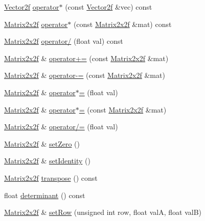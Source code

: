 \begin{DoxyCompactItemize}
\hyperlink{classh2_1_1_vector2f}{Vector2f} \hyperlink{classh2_1_1_matrix2x2f_a3ad4e56558f1a3640ebc45496bcd9bb0}{operator$\ast$} (const \hyperlink{classh2_1_1_vector2f}{Vector2f} \&vec) const 
\item 
\hyperlink{classh2_1_1_matrix2x2f}{Matrix2x2f} \hyperlink{classh2_1_1_matrix2x2f_abffdd48dd8586bc988bdf63a3cc94dad}{operator$\ast$} (const \hyperlink{classh2_1_1_matrix2x2f}{Matrix2x2f} \&mat) const 
\item 
\hyperlink{classh2_1_1_matrix2x2f}{Matrix2x2f} \hyperlink{classh2_1_1_matrix2x2f_ae05912db875fc5b7bfd77773f184a35d}{operator/} (float val) const 
\item 
\hyperlink{classh2_1_1_matrix2x2f}{Matrix2x2f} \& \hyperlink{classh2_1_1_matrix2x2f_ae3acc20003e50ded1a4848ab920c76e2}{operator+=} (const \hyperlink{classh2_1_1_matrix2x2f}{Matrix2x2f} \&mat)
\item 
\hyperlink{classh2_1_1_matrix2x2f}{Matrix2x2f} \& \hyperlink{classh2_1_1_matrix2x2f_a2d690ddea1dc40e8788c00aac187dba9}{operator-\/=} (const \hyperlink{classh2_1_1_matrix2x2f}{Matrix2x2f} \&mat)
\item 
\hyperlink{classh2_1_1_matrix2x2f}{Matrix2x2f} \& \hyperlink{classh2_1_1_matrix2x2f_a54fbc643d202dfde6b97dc0d6d4ebb6d}{operator$\ast$=} (float val)
\item 
\hyperlink{classh2_1_1_matrix2x2f}{Matrix2x2f} \& \hyperlink{classh2_1_1_matrix2x2f_aa56e404e4a178b2b59c54452822f9dd0}{operator$\ast$=} (const \hyperlink{classh2_1_1_matrix2x2f}{Matrix2x2f} \&mat)
\item 
\hyperlink{classh2_1_1_matrix2x2f}{Matrix2x2f} \& \hyperlink{classh2_1_1_matrix2x2f_a5412f6ddb68a2e78b83eef38eb179e66}{operator/=} (float val)
\item 
\hyperlink{classh2_1_1_matrix2x2f}{Matrix2x2f} \& \hyperlink{classh2_1_1_matrix2x2f_ae9b1663dd98660bd3e5171e494b96ebf}{set\-Zero} ()
\item 
\hyperlink{classh2_1_1_matrix2x2f}{Matrix2x2f} \& \hyperlink{classh2_1_1_matrix2x2f_a9f9675da3742285a0f548a1f62582cd7}{set\-Identity} ()
\item 
\hyperlink{classh2_1_1_matrix2x2f}{Matrix2x2f} \hyperlink{classh2_1_1_matrix2x2f_a817dbb094cf15f639c1711a0447b5a71}{transpose} () const 
\item 
float \hyperlink{classh2_1_1_matrix2x2f_a7bb2bb604b4726ed0db055879aa4dc73}{determinant} () const 
\item 
\hyperlink{classh2_1_1_matrix2x2f}{Matrix2x2f} \& \hyperlink{classh2_1_1_matrix2x2f_a3f938738999032afdd93b74c6bf7016a}{set\-Row} (unsigned int row, float val\-A, float val\-B)

\end{DoxyCompactItemize}
